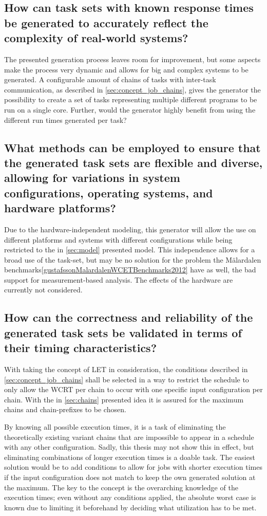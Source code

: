 \subsection{How can task sets with known response times be generated to accurately reflect the complexity of real-world systems?}\label{subsec:summary:Q1}
The presented generation process leaves room for improvement, but some aspects make the process very dynamic and allows for big and complex systems to be generated.
A configurable amount of chains of tasks with inter-task communication, as described in \cref{sec:concept_job_chains}, gives the generator the possibility to create a set of tasks representing multiple different programs to be run on a single core.
Further, would the generator highly benefit from using the different run times generated per task?

\subsection{What methods can be employed to ensure that the generated task sets are flexible and diverse, allowing for variations in system configurations, operating systems, and hardware platforms?}\label{subsec:summary:Q2}
Due to the hardware-independent modeling, this generator will allow the use on different platforms and systems with different configurations while being restricted to the in \cref{sec:model} presented model.
This independence allows for a broad use of the task-set, but may be no solution for the problem the Mälardalen benchmarks\cref{gustafssonMalardalenWCETBenchmarks2012} have as well, the bad support for measurement-based analysis.
The effects of the hardware are currently not considered.

\subsection{How can the correctness and reliability of the generated task sets be validated in terms of their timing characteristics?}\label{subsec:summary:Q3}
With taking the concept of \ac{LET} in consideration, the conditions described in \cref{sec:concept_job_chains} shall be selected in a way to restrict the schedule to only allow the \ac{WCRT} per chain to occur with one specific input configuration per chain.
With the in \cref{sec:chains} presented idea it is assured for the maximum chains and chain-prefixes to be chosen.

By knowing all possible execution times, it is a task of eliminating the theoretically existing variant chains that are impossible to appear in a schedule with any other configuration.
Sadly, this thesis may not show this in effect, but eliminating combinations of longer execution times is a doable task.
The easiest solution would be to add conditions to allow for jobs with shorter execution times if the input configuration does not match to keep the own generated solution at the maximum.
The key to the concept is the overarching knowledge of the execution times; even without any conditions applied, the absolute worst case is known due to limiting it beforehand by deciding what utilization has to be met.

